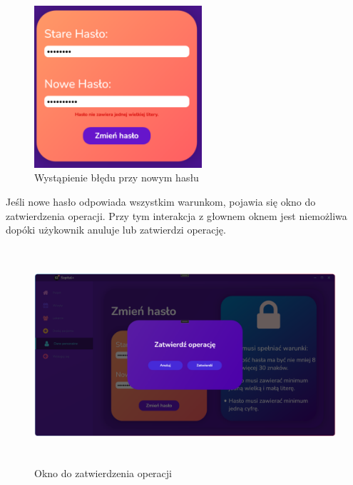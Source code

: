 \begin{figure}[H]
\begin{center}
    \includegraphics[height=6cm]{images/blad_nowe_hasl.png}
    \caption{Wystąpienie błędu przy nowym hasłu}
\end{center}
\end{figure}

Jeśli nowe hasło odpowiada wszystkim warunkom, pojawia się okno do zatwierdzenia operacji. Przy tym interakcja z głownem oknem jest niemożliwa dopóki użykownik anuluje lub zatwierdzi operację.

\begin{figure}[H]
\begin{center}
    \includegraphics[height=8cm]{images/zatw_oper.png}
    \caption{Okno do zatwierdzenia operacji}
\end{center}
\end{figure}

